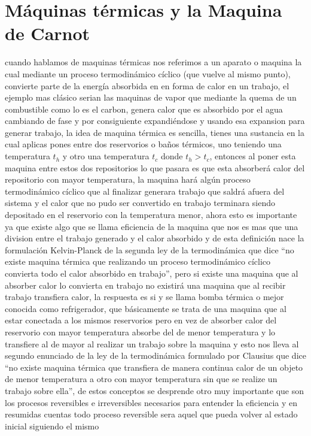 \documentclass{article}
\begin{document}
\section*{Máquinas térmicas y la Maquina de Carnot}
cuando hablamos de maquinas térmicas nos referimos a un aparato o maquina la cual mediante un proceso termodinámico cíclico (que vuelve al mismo punto), 
convierte parte de la energía absorbida en en forma de calor en un trabajo, el ejemplo mas clásico serian las maquinas de vapor que mediante la quema de un
combustible como lo es el carbon, genera calor que es absorbido por el agua cambiando de fase y por consiguiente expandiéndose y usando esa expansion para
generar trabajo, la idea de maquina térmica es sencilla, tienes una sustancia en la cual aplicas pones entre dos reservorios o baños térmicos, uno 
teniendo una temperatura $t_h$ y otro una temperatura $t_c$ donde $t_h>t_c$, entonces al poner esta maquina entre estos dos repositorios lo que pasara 
es que esta absorberá calor del repositorio con mayor temperatura, la maquina hará algún proceso termodinámico cíclico que al finalizar generara trabajo 
que saldrá afuera del sistema y el calor que no pudo ser convertido en trabajo terminara siendo depositado en el reservorio con la temperatura menor,
ahora esto es importante ya que existe algo que se llama eficiencia de la maquina que nos es mas que una division entre el trabajo generado y el calor absorbido
y de esta definición nace la formulación Kelvin-Planck de la segunda ley de la termodinámica que dice ``no existe maquina térmica que realizando un proceso
termodinámico cíclico convierta todo el calor absorbido en trabajo'', pero si existe una maquina que al absorber calor lo convierta en trabajo no existirá
una maquina que al recibir trabajo transfiera calor, la respuesta es si y se llama bomba térmica o mejor conocida como refrigerador, que básicamente se
trata de una maquina que al estar conectada a los mismos reservorios pero en vez de absorber calor del reservorio con mayor temperatura absorbe del de menor 
temperatura y lo transfiere al de mayor al realizar un trabajo sobre la maquina y esto nos lleva al segundo enunciado de la ley de la termodinámica 
formulado por Clausius que dice ``no existe maquina térmica que transfiera de manera continua calor de un objeto de menor temperatura a otro con mayor 
temperatura sin que se realize un trabajo sobre ella'', de estos conceptos se desprende otro muy importante que son los procesos reversibles e irreversibles
necesarios para entender la eficiencia y en resumidas cuentas todo proceso reversible sera aquel que pueda volver al estado inicial siguiendo el mismo
\end{document}
